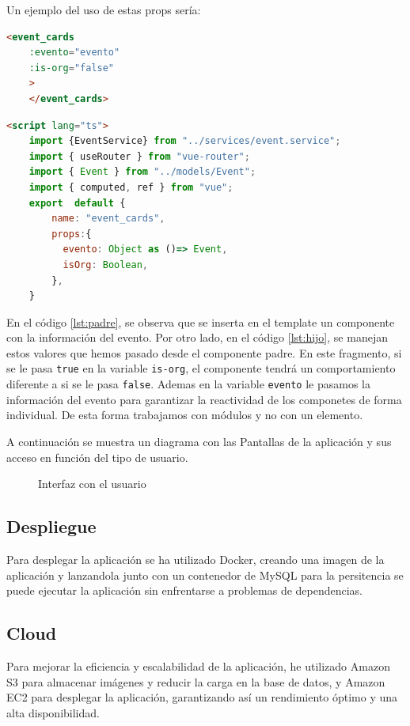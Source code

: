Un ejemplo del uso de estas props sería:
\myvuestyle
\begin{lstlisting}[language=HTML, caption=Ejemplo del Padre, label=lst:padre]
    <event_cards
    :evento="evento"
    :is-org="false"
    >
    </event_cards>
\end{lstlisting}
\myvuestyle
\begin{lstlisting}[language=HTML, caption=Ejemplo del Hijo, label=lst:hijo]
    <script lang="ts">
    import {EventService} from "../services/event.service";
    import { useRouter } from "vue-router";
    import { Event } from "../models/Event";
    import { computed, ref } from "vue";
    export  default {
        name: "event_cards",
        props:{
          evento: Object as ()=> Event,
          isOrg: Boolean,
        },
    }
\end{lstlisting}

En el código \ref{lst:padre}, se observa que se inserta en el template un componente con la información del evento. Por otro lado, en el código 
\ref{lst:hijo}, se manejan estos valores que hemos pasado desde el componente padre. En este fragmento, si se le pasa \texttt{true} en la variable 
\texttt{is-org}, el componente tendrá un comportamiento diferente a si se le pasa \texttt{false}. Ademas en la variable \texttt{evento} le pasamos la información
del evento para garantizar la reactividad de los componetes de forma individual. De esta forma trabajamos con módulos y no con un elemento.

\newpage
A continuación se muestra un diagrama con las Pantallas de la aplicación y sus acceso en función del tipo de usuario.
\begin{figure}[h]
    \centering
    \caption{Interfaz con el usuario}
    \label{fig:userInterface}
\end{figure}

\newpage
\subsection{Despliegue}
Para desplegar la aplicación se ha utilizado Docker, creando una imagen de la aplicación y lanzandola junto con un contenedor de MySQL para la persitencia se puede ejecutar
la aplicación sin enfrentarse a problemas de dependencias.

\subsection{Cloud}
Para mejorar la eficiencia y escalabilidad de la aplicación, he utilizado Amazon S3 para almacenar imágenes y reducir la carga en la base de datos, y 
Amazon EC2 para desplegar la aplicación, garantizando así un rendimiento óptimo y una alta disponibilidad. 

